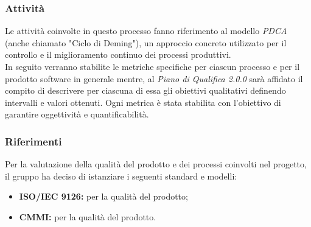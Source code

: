 \subsubsection{Attività}
Le attività coinvolte in questo processo fanno riferimento al modello \textit{PDCA\glo} (anche chiamato "Ciclo di Deming"), un approccio concreto utilizzato per il controllo e il miglioramento continuo dei processi produttivi.\\
In seguito verranno stabilite le metriche specifiche per ciascun processo e per il prodotto software in generale mentre, al \textit{Piano di Qualifica 2.0.0\doc} sarà affidato il compito di descrivere per ciascuna di essa gli obiettivi qualitativi definendo intervalli e valori ottenuti. Ogni metrica è stata stabilita con l'obiettivo di garantire oggettività e quantificabilità.



\subsubsection{Riferimenti}
Per la valutazione della qualità del prodotto e dei processi coinvolti nel progetto, il gruppo ha deciso di istanziare i seguenti standard e modelli:
\begin{itemize}
	\item \textbf{ISO/IEC 9126:} per la qualità del prodotto;
	\item \textbf{CMMI:} per la qualità del prodotto.
\end{itemize}
